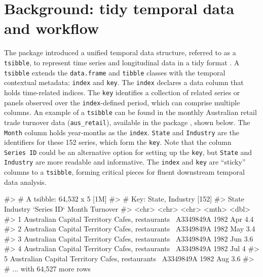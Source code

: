 \hypertarget{background-tidy-temporal-data-and-workflow}{%
\section{Background: tidy temporal data and
workflow}\label{background-tidy-temporal-data-and-workflow}}

The  package \citep{wang2020tsibble} introduced a
unified temporal data structure, referred to as a \texttt{tsibble}, to
represent time series and longitudinal data in a tidy format
\citep{wickham2014tidy}. A \texttt{tsibble} extends the
\texttt{data.frame} and \texttt{tibble} classes with the temporal
contextual metadata: \texttt{index} and \texttt{key}. The \texttt{index}
declares a data column that holds time-related indices. The \texttt{key}
identifies a collection of related series or panels observed over the
\texttt{index}-defined period, which can comprise multiple columns. An
example of a \texttt{tsibble} can be found in the monthly Australian
retail trade turnover data (\texttt{aus\_retail}), available in the
 package \citep{R-tsibbledata}, shown below. The
\texttt{Month} column holds year-months as the \texttt{index}.
\texttt{State} and \texttt{Industry} are the identifiers for these 152
series, which form the \texttt{key}. Note that the column
\texttt{Series\ ID} could be an alternative option for setting up the
\texttt{key}, but \texttt{State} and \texttt{Industry} are more readable
and informative. The \texttt{index} and \texttt{key} are ``sticky''
columns to a \texttt{tsibble}, forming critical pieces for fluent
downstream temporal data analysis.

\begin{Schunk}
\begin{Soutput}
#> # A tsibble: 64,532 x 5 [1M]
#> # Key:       State, Industry [152]
#>   State                        Industry            `Series ID`    Month Turnover
#>   <chr>                        <chr>               <chr>          <mth>    <dbl>
#> 1 Australian Capital Territory Cafes, restaurants~ A3349849A   1982 Apr      4.4
#> 2 Australian Capital Territory Cafes, restaurants~ A3349849A   1982 May      3.4
#> 3 Australian Capital Territory Cafes, restaurants~ A3349849A   1982 Jun      3.6
#> 4 Australian Capital Territory Cafes, restaurants~ A3349849A   1982 Jul      4  
#> 5 Australian Capital Territory Cafes, restaurants~ A3349849A   1982 Aug      3.6
#> # ... with 64,527 more rows
\end{Soutput}
\end{Schunk}

